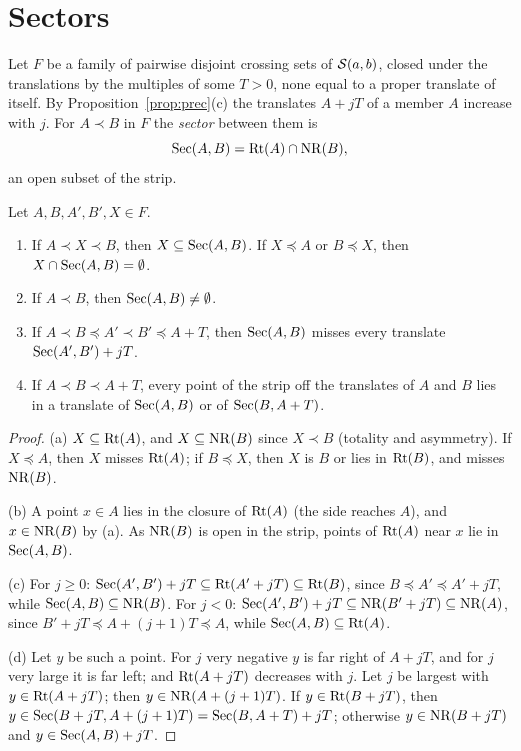 
\section{Sectors}

Let $F$ be a family of pairwise disjoint crossing sets of $\mathcal{S}(a,b)$, closed under the translations by the multiples of some $T>0$, none equal to a proper translate of
itself. By Proposition~\ref{prop:prec}(c) the translates $A+jT$ of a member $A$ increase with $j$. For $A\prec B$ in $F$ the \emph{sector} between them is
\[
\operatorname{Sec}(A,B)=\operatorname{Rt}(A)\cap\operatorname{NR}(B),
\]
an open subset of the strip.


\begin{proposition}\label{prop:sectors}
Let $A,B,A',B',X\in F$.
\begin{enumerate}[label=(\alph*)]
\item If $A\prec X\prec B$, then $X\subseteq\operatorname{Sec}(A,B)$. If $X\preceq A$ or $B\preceq X$, then $X\cap\operatorname{Sec}(A,B)=\emptyset$.
\item If $A\prec B$, then $\operatorname{Sec}(A,B)\ne\emptyset$.
\item If $A\prec B\preceq A'\prec B'\preceq A+T$, then $\operatorname{Sec}(A,B)$ misses every translate $\operatorname{Sec}(A',B')+jT$.
\item If $A\prec B\prec A+T$, every point of the strip off the translates of $A$ and $B$ lies in a translate of $\operatorname{Sec}(A,B)$ or of $\operatorname{Sec}(B,A+T)$.
\end{enumerate}
\end{proposition}

\begin{proof}
(a) $X\subseteq\operatorname{Rt}(A)$, and $X\subseteq\operatorname{NR}(B)$ since $X\prec B$ (totality and asymmetry). If $X\preceq A$, then $X$ misses $\operatorname{Rt}(A)$; if $B\preceq X$, then $X$ is $B$ or lies in
$\operatorname{Rt}(B)$, and misses $\operatorname{NR}(B)$.

(b) A point $x\in A$ lies in the closure of $\operatorname{Rt}(A)$ (the side reaches $A$), and $x\in\operatorname{NR}(B)$ by (a). As $\operatorname{NR}(B)$ is open in the strip, points of $\operatorname{Rt}(A)$ near $x$ lie in
$\operatorname{Sec}(A,B)$.

(c) For $j\ge0$: $\operatorname{Sec}(A',B')+jT\subseteq\operatorname{Rt}(A'+jT)\subseteq\operatorname{Rt}(B)$, since $B\preceq A'\preceq A'+jT$, while $\operatorname{Sec}(A,B)\subseteq\operatorname{NR}(B)$. For $j<0$: $\operatorname{Sec}(A',B')+jT\subseteq\operatorname{NR}(B'+jT)\subseteq\operatorname{NR}(A)$,
since $B'+jT\preceq A+(j+1)T\preceq A$, while $\operatorname{Sec}(A,B)\subseteq\operatorname{Rt}(A)$.

(d) Let $y$ be such a point. For $j$ very negative $y$ is far right of $A+jT$, and for $j$ very large it is far left; and $\operatorname{Rt}(A+jT)$ decreases with $j$. Let $j$ be largest with $y\in
\operatorname{Rt}(A+jT)$; then $y\in\operatorname{NR}(A+(j+1)T)$. If $y\in\operatorname{Rt}(B+jT)$, then $y\in\operatorname{Sec}(B+jT,A+(j+1)T)=\operatorname{Sec}(B,A+T)+jT$; otherwise $y\in\operatorname{NR}(B+jT)$ and $y\in\operatorname{Sec}(A,B)+jT$.
\end{proof}

